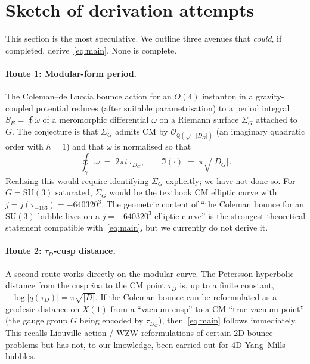 \documentclass[11pt,a4paper]{article}
\theoremstyle{plain}
\theoremstyle{definition}
\newcommand{\Q}{\mathbb{Q}}
\newcommand{\OK}{\mathcal{O}}
\newcommand{\SU}{\mathrm{SU}}
\begin{document}
\section{Sketch of derivation attempts}\label{sec:derivation}

This section is the most speculative. We outline three avenues that \emph{could}, if completed, derive~\eqref{eq:main}. None is complete.

\paragraph{Route 1: Modular-form period.}
The Coleman--de Luccia bounce action for an $O(4)$ instanton in a gravity-coupled potential reduces (after suitable parametrisation) to a period integral $S_E=\oint\omega$ of a meromorphic differential $\omega$ on a Riemann surface $\Sigma_G$ attached to $G$. The conjecture is that $\Sigma_G$ admits CM by $\OK_{\Q(\sqrt{-|D_G|})}$ (an imaginary quadratic order with $h=1$) and that $\omega$ is normalised so that
\[
\oint_\gamma\omega \;=\; 2\pi i\,\tau_{D_G},
\qquad \Im(\cdot)\;=\;\pi\sqrt{|D_G|}.
\]
Realising this would require identifying $\Sigma_G$ explicitly; we have not done so. For $G=\SU(3)$ saturated, $\Sigma_G$ would be the textbook CM elliptic curve with $j=j(\tau_{-163})=-640320^3$. The geometric content of ``the Coleman bounce for an $\SU(3)$ bubble lives on a $j=-640320^3$ elliptic curve'' is the strongest theoretical statement compatible with~\eqref{eq:main}, but we currently do not derive it.

\paragraph{Route 2: $\tau_D$-cusp distance.}
A second route works directly on the modular curve. The Petersson hyperbolic distance from the cusp $i\infty$ to the CM point $\tau_D$ is, up to a finite constant, $-\log|q(\tau_D)|=\pi\sqrt{|D|}$. If the Coleman bounce can be reformulated as a geodesic distance on $X(1)$ from a ``vacuum cusp'' to a CM ``true-vacuum point'' (the gauge group $G$ being encoded by $\tau_{D_G}$), then~\eqref{eq:main} follows immediately. This recalls Liouville-action / WZW reformulations of certain 2D bounce problems but has not, to our knowledge, been carried out for 4D Yang--Mills bubbles.
\end{document}
